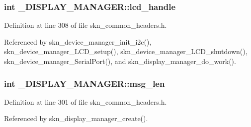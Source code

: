\hypertarget{struct___d_i_s_p_l_a_y___m_a_n_a_g_e_r_a6ebc44b98c1483295586660829eb5a43}{}
\subsubsection[{lcd\+\_\+handle}]{\setlength{\rightskip}{0pt plus 5cm}int \+\_\+\+D\+I\+S\+P\+L\+A\+Y\+\_\+\+M\+A\+N\+A\+G\+E\+R\+::lcd\+\_\+handle}\label{struct___d_i_s_p_l_a_y___m_a_n_a_g_e_r_a6ebc44b98c1483295586660829eb5a43}


Definition at line 308 of file skn\+\_\+common\+\_\+headers.\+h.



Referenced by skn\+\_\+device\+\_\+manager\+\_\+init\+\_\+i2c(), skn\+\_\+device\+\_\+manager\+\_\+\+L\+C\+D\+\_\+setup(), skn\+\_\+device\+\_\+manager\+\_\+\+L\+C\+D\+\_\+shutdown(), skn\+\_\+device\+\_\+manager\+\_\+\+Serial\+Port(), and skn\+\_\+display\+\_\+manager\+\_\+do\+\_\+work().

\hypertarget{struct___d_i_s_p_l_a_y___m_a_n_a_g_e_r_a10067d9a5974f5f19bf638ee72ddd973}{}
\subsubsection[{msg\+\_\+len}]{\setlength{\rightskip}{0pt plus 5cm}int \+\_\+\+D\+I\+S\+P\+L\+A\+Y\+\_\+\+M\+A\+N\+A\+G\+E\+R\+::msg\+\_\+len}\label{struct___d_i_s_p_l_a_y___m_a_n_a_g_e_r_a10067d9a5974f5f19bf638ee72ddd973}


Definition at line 301 of file skn\+\_\+common\+\_\+headers.\+h.



Referenced by skn\+\_\+display\+\_\+manager\+\_\+create().

\hypertarget{struct___d_i_s_p_l_a_y___m_a_n_a_g_e_r_aed299ac3603bba3dfe3c09389122f8d8}{}
